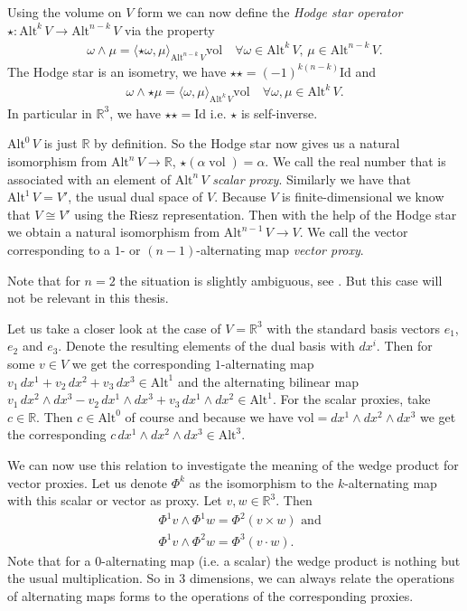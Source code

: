 \documentclass[12pt,a4paper]{article}
\numberwithin{equation}{subsection}
\numberwithin{lemma}{subsection}
\theoremstyle{definition}
\DeclareMathOperator{\vol}{vol}
\newcommand{\alternating}[2]{ {\text{Alt}^{#1}\,#2} }
\newcommand{\real}{\mathbb{R}}
\begin{document}
Using the volume on $V$
form we can now define the \textit{Hodge star operator} 
$\star: \alternating{k}{V} \rightarrow \alternating{n-k}{V}$ via the property 
\begin{align*}
    \omega \wedge \mu = \langle \star\omega, \mu \rangle_{\alternating{n-k}{V}} 
    \text{vol}
    \quad \forall \omega \in \alternating{k}{V} , \, 
    \mu \in \alternating{n-k}{V}.
\end{align*}
The Hodge star is an isometry, we have $\star\star = (-1)^{k(n-k)}\text{Id}$ and 
\begin{align*}
    \omega \wedge \star\mu = \langle \omega, \mu \rangle_{\alternating{k}{V}} 
    \text{vol} \quad \forall \omega, \mu \in \alternating{k}{V}.
\end{align*}
In particular in $\real^3$, we have 
$\star\star = \text{Id}$ i.e. $\star$ is self-inverse.


$\alternating{0}{V}$ is just $\real$ by definition. So the Hodge star 
now gives us a natural isomorphism from $\alternating{n}{V} \rightarrow \real$,
$\star (\alpha \vol) = \alpha$.
We call the real number that is associated with an element of 
$\alternating{n}{V}$ \textit{scalar proxy}. Similarly we have that 
$\alternating{1}{V} = V'$, the usual dual space of $V$. Because $V$ is 
finite-dimensional we know that $V \cong V'$ using the Riesz representation.
Then with the help of the Hodge star we obtain a natural isomorphism 
from $\alternating{n-1}{V} \rightarrow V$. We call the vector corresponding
to a $1$- or $(n-1)$-alternating map \textit{vector proxy}. 

Note that for $n=2$ the situation 
is slightly ambiguous, see \cite[p.67]{arnold}. But this case will not be
relevant in this thesis.


Let us take a closer look at the case of $V= \real^3$ with the standard basis
vectors $e_1$, $e_2$ and $e_3$. Denote the resulting elements 
of the dual basis with $dx^i$. Then for some $v\in V$ we get the 
corresponding $1$-alternating map $v_1 \, dx^1 + v_2 \, dx^2 + v_3 \, dx^3 \in 
\text{Alt}^1$ and the alternating bilinear map
$v_1\, dx^2 \wedge dx^3 - v_2 \,dx^1 \wedge dx^3 + v_3 \,dx^1 \wedge dx^2 \in 
\text{Alt}^1$. For the scalar proxies, take $c \in \real$. Then 
$c \in \text{Alt}^0$ of course and because 
we have $\text{vol} = dx^1\wedge dx^2\wedge dx^3$ we get the corresponding 
$c \, dx^1\wedge dx^2\wedge dx^3 \in \text{Alt}^3$.


We can now use this relation to investigate the meaning of the wedge product
for vector proxies. Let us denote $\Phi^k$ as the isomorphism to the
$k$-alternating map with this scalar or vector as proxy. 
Let $v, w \in  \real^3$. Then 
\begin{align*}
    &\Phi^1 v \wedge \Phi^1 w = \Phi^2 (v\times w) \text{ and} \\
    &\Phi^1 v \wedge \Phi^2 w = \Phi^3 (v \cdot w).
\end{align*}
Note that for a $0$-alternating map (i.e. a scalar) 
the wedge product is nothing but the usual multiplication.
So in 3 dimensions, we can always relate the operations of alternating maps 
forms to the operations of the corresponding proxies. 
\end{document}
